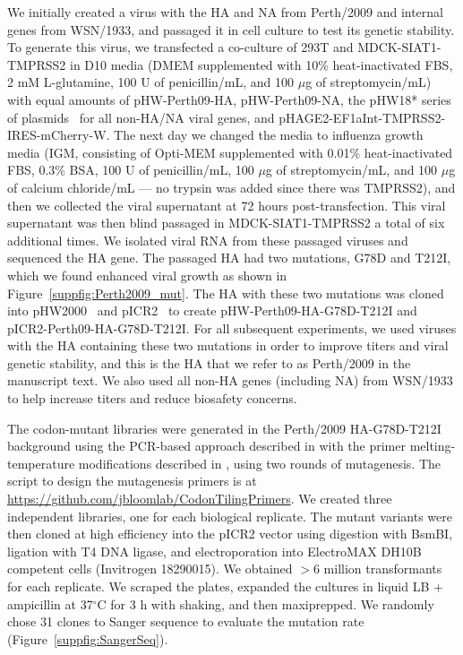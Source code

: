 \documentclass[9pt,twocolumn,twoside]{pnas-new}
\begin{document}
{We initially created a virus with the HA and NA from Perth/2009 and internal genes from WSN/1933, and passaged it in cell culture to test its genetic stability.
To generate this virus, we transfected a co-culture of 293T and MDCK-SIAT1-TMPRSS2 in D10 media (DMEM supplemented with 10\% heat-inactivated FBS, 2 mM L-glutamine, 100 U of penicillin/mL, and 100 $\mu$g of streptomycin/mL) with equal amounts of pHW-Perth09-HA, pHW-Perth09-NA, the pHW18* series of plasmids~\cite{hoffmann2000dna} for all non-HA/NA viral genes, and pHAGE2-EF1aInt-TMPRSS2-IRES-mCherry-W.
The next day we changed the media to influenza growth media (IGM, consisting of Opti-MEM supplemented with 0.01\% heat-inactivated FBS, 0.3\% BSA, 100 U of penicillin/mL, 100 $\mu$g of streptomycin/mL, and 100 $\mu$g of calcium chloride/mL --- no trypsin was added since there was TMPRSS2), and then we collected the viral supernatant at 72 hours post-transfection.
This viral supernatant was then blind passaged in MDCK-SIAT1-TMPRSS2 a total of six additional times.
We isolated viral RNA from these passaged viruses and sequenced the HA gene.
The passaged HA had two mutations, G78D and T212I, which we found enhanced viral growth as shown in Figure~\ref{suppfig:Perth2009_mut}.
The HA with these two mutations was cloned into pHW2000~\citep{hoffmann2000dna} and pICR2~\cite{ashenberg2017deep} to create pHW-Perth09-HA-G78D-T212I and pICR2-Perth09-HA-G78D-T212I.
For all subsequent experiments, we used viruses with the HA containing these two mutations in order to improve titers and viral genetic stability, and this is the HA that we refer to as Perth/2009 in the manuscript text.
We also used all non-HA genes (including NA) from WSN/1933 to help increase titers and reduce biosafety concerns.

The codon-mutant libraries were generated in the Perth/2009 HA-G78D-T212I background using the PCR-based approach described in \cite{bloom2014experimentally} with the primer melting-temperature modifications described in \cite{dingens2017comprehensive}, using two rounds of mutagenesis.
The script to design the mutagenesis primers is at \url{https://github.com/jbloomlab/CodonTilingPrimers}.
We created three independent libraries, one for each biological replicate.
The mutant variants were then cloned at high efficiency into the pICR2 vector using digestion with BsmBI, ligation with T4 DNA ligase, and electroporation into ElectroMAX DH10B competent cells (Invitrogen 18290015). 
We obtained $>$6 million transformants for each replicate.
We scraped the plates, expanded the cultures in liquid LB + ampicillin at 37$^{\circ}$C for 3 h with shaking, and then maxiprepped.
We randomly chose 31 clones to Sanger sequence to evaluate the mutation rate (Figure~\ref{suppfig:SangerSeq}).

}
\end{document}

